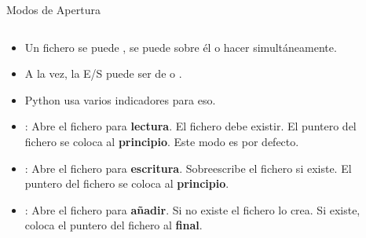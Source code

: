 \documentclass[10pt, envcountsect , spanish]{beamer}
\begin{document}
\begin{frame}{Modos de Apertura} 

\begin{columns}

\begin{column}{.79\textwidth}

\begin{itemize}
\item Un fichero se puede , se puede  sobre él o hacer  simultáneamente.

\item A la vez, la E/S puede ser de  o .

\item Python usa varios indicadores para eso.

\item{}: Abre el fichero para \textbf{lectura}. El fichero debe existir. El puntero del fichero se coloca al \textbf{principio}. Este modo es por defecto.
\item {}: Abre el fichero para \textbf{escritura}. Sobreescribe el fichero si existe. El puntero del fichero se coloca al \textbf{principio}. 
\item {}: Abre el fichero para \textbf{añadir}. Si no existe el fichero lo crea. Si existe, coloca el puntero del fichero al \textbf{final}.

\end{itemize}

\end{column}

\begin{column}{.19\textwidth}

\begin{tikzpicture}[x=0.75pt,y=0.75pt,yscale=-0.5,xscale=0.5]


\end{tikzpicture}
\end{column}
\end{columns}
\end{frame}
\end{document}
